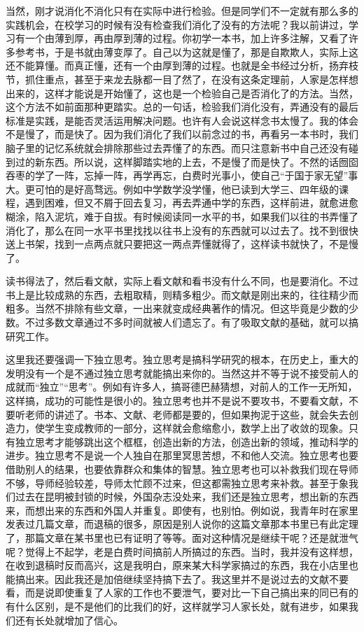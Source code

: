 \documentclass[twoside,openright,headings=optiontohead]{ctexbook} %
\begin{document}
{当然，刚才说消化不消化只有在实际中进行检验。但是同学们不一定就有那么多的实践机会，在校学习的时候有没有检查我们消化了没有的方法呢？我以前讲过，学习有一个由薄到厚，再由厚到薄的过程。你初学一本书，加上许多注解，又看了许多参考书，于是书就由薄变厚了。自己以为这就是懂了，那是自欺欺人，实际上这还不能算懂。而真正懂，还有一个由厚到薄的过程。也就是全书经过分析，扬弃枝节，抓住重点，甚至于来龙去脉都一目了然了，在没有这条定理前，人家是怎样想出来的，这样才能说是开始懂了，这也是一个检验自己是否消化了的方法。当然，这个方法不如前面那种更踏实。总的一句话，检验我们消化没有，弄通没有的最后标准是实践，是能否灵活运用解决问题。也许有人会说这样念书太慢了。我的体会不是慢了，而是快了。因为我们消化了我们以前念过的书，再看另一本书时，我们脑子里的记忆系统就会排除那些过去弄懂了的东西。而只注意新书中自己还没有碰到过的新东西。所以说，这样脚踏实地的上去，不是慢了而是快了。不然的话囫囵吞枣的学了一阵，忘掉一阵，再学再忘，白费时光事小，使自己``于国于家无望''事大。更可怕的是好高骛远。例如中学数学没学懂，他已读到大学三、四年级的课程，遇到困难，但又不屑于回去复习，再去弄通中学的东西，这样前进，就愈进愈糊涂，陷入泥坑，难于自拔。有时候阅读同一水平的书，如果我们以往的书弄懂了消化了，那么在同一水平书里找找以往书上没有的东西就可以过去了。找不到很快送上书架，找到一点两点就只要把这一两点弄懂就得了，这样读书就快了，不是慢了。

读书得法了，然后看文献，实际上看文献和看书没有什么不同，也是要消化。不过书上是比较成熟的东西，去粗取精，则精多粗少。而文献是刚出来的，往往精少而粗多。当然不排除有些文章，一出来就变成经典著作的情况。但这毕竟是少数的少数。不过多数文章通过不多时间就被人们遗忘了。有了吸取文献的基础，就可以搞研究工作。

这里我还要强调一下独立思考。独立思考是搞科学研究的根本，在历史上，重大的发明没有一个是不通过独立思考就能搞出来你的。当然这并不等于说不接受前人的成就而``独立''``思考''。例如有许多人，搞哥德巴赫猜想，对前人的工作一无所知，这样搞，成功的可能性是很小的。独立思考也并不是说不要攻书，不要看文献，不要听老师的讲述了。书本、文献、老师都是要的，但如果拘泥于这些，就会失去创造力，使学生变成教师的一部分，这样就会愈缩愈小，数学上出了收敛的现象。只有独立思考才能够跳出这个框框，创造出新的方法，创造出新的领域，推动科学的进步。独立思考不是说一个人独自在那里冥思苦想，不和他人交流。独立思考也要借助别人的结果，也要依靠群众和集体的智慧。独立思考也可以补救我们现在导师不够，导师经验较差，导师太忙顾不过来，但这都需独立思考来补救。甚至于象我们过去在昆明被封锁的时候，外国杂志没处来，我们还是独立思考，想出新的东西来，而想出来的东西和外国人并重复。即使有，也别怕。例如说，我青年时在家里发表过几篇文章，而退稿的很多，原因是别人说你的这篇文章那本书里已有此定理了，那篇文章在某书里也已有证明了等等。面对这种情况是继续干呢？还是就泄气呢？觉得上不起学，老是白费时间搞前人所搞过的东西。当时，我并没有这样想，在收到退稿时反而高兴，这是我明白，原来某大科学家搞过的东西，我在小店里也能搞出来。因此我还是加倍继续坚持搞下去了。我这里并不是说过去的文献不要看，而是说即使重复了人家的工作也不要泄气，要对比一下自己搞出来的同已有的有什么区别，是不是他们的比我们的好，这样就学习人家长处，就有进步，如果我们还有长处就增加了信心。

}
\end{document}
